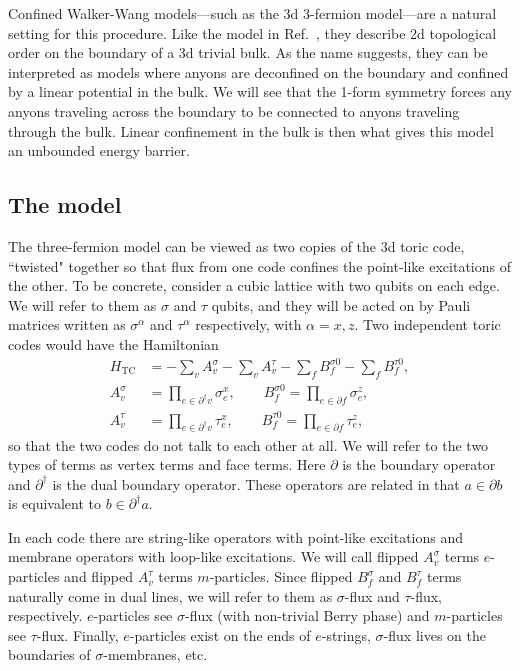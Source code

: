 \documentclass[twocolumn, longbibliography]{revtex4-2}
\newcommand{\TC}{\text{TC}}
\newcommand{\nn}{\nonumber\\}
\newcommand{\pardag}{\partial^\dagger\!}
\begin{document}
Confined Walker-Wang models---such as the 3d 3-fermion model---are a natural setting for this procedure. Like the model in Ref.~\cite{RobertsBartlett}, they describe 2d topological order on the boundary of a 3d trivial bulk. As the name suggests, they can be interpreted as models where anyons are deconfined on the boundary and confined by a linear potential in the bulk. We will see that the 1-form symmetry forces any anyons traveling across the boundary to be connected to anyons traveling through the bulk. Linear confinement in the bulk is then what gives this model an unbounded energy barrier.
	
\subsection{The model}

The three-fermion model can be viewed as two copies of the 3d toric code, ``twisted" together so that flux from one code confines the point-like excitations of the other. To be concrete, consider a cubic lattice with two qubits on each edge. We will refer to them as $\sigma$ and $\tau$ qubits, and they will be acted on by Pauli matrices written as $\sigma^\alpha$ and $\tau^\alpha$ respectively, with $\alpha = x,z$. Two independent toric codes would have the Hamiltonian 
\begin{align}
H_{\TC} &= -\sum_vA_v^{\sigma}-\sum_vA_v^{\tau}-\sum_fB_f^{\sigma0}-\sum_fB_f^{\tau0},\nn
A_v^{\sigma} &= \prod_{e\in \pardag v}\sigma_e^x, \qquad B_f^{\sigma0} = \prod_{e\in\partial f}\sigma_e^z,\nn
A_v^{\tau} &= \prod_{e\in \pardag v}\tau_e^x, \qquad B_f^{\tau0} = \prod_{e\in\partial f}\tau_e^z, \label{eqn:toric}
\end{align}
so that the two codes do not talk to each other at all. We will refer to the two types of terms as vertex terms and face terms. Here $\partial$ is the boundary operator and $\pardag$ is the dual boundary operator. These operators are related in that $a\in\partial b$ is equivalent to $b\in\pardag a$.
	
In each code there are string-like operators with point-like excitations and membrane operators with loop-like excitations. We will call flipped $A_v^\sigma$ terms $e$-particles and flipped $A_v^\tau$ terms $m$-particles. Since flipped $B_f^\sigma$ and $B_f^\tau$ terms naturally come in dual lines, we will refer to them as $\sigma$-flux and $\tau$-flux, respectively. $e$-particles see $\sigma$-flux (with non-trivial Berry phase) and $m$-particles see $\tau$-flux. Finally, $e$-particles exist on the ends of $e$-strings, $\sigma$-flux lives on the boundaries of $\sigma$-membranes, etc.
\end{document}
